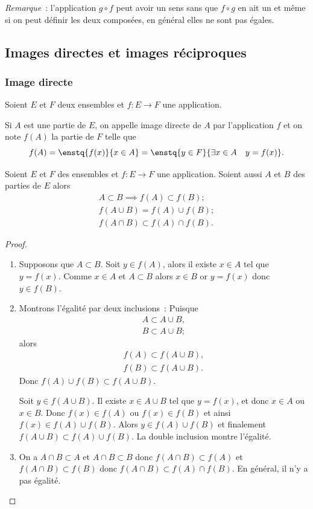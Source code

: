 \emph{Remarque}~: l'application $g \circ f$ peut avoir un sens sans que $f \circ g$ en ait un et même si on peut définir les deux composées, en général elles ne sont pas égales.
%
\subsection{Images directes et images réciproques}
\label{chap3-subsec:imagesdirecteetrec}
\subsubsection{Image directe}
\label{chap3-subsec:imagedirecte}
Soient $E$ et $F$ deux ensembles et $f: E \longrightarrow F$ une application.
\begin{defdef}
  Si $A$ est une partie de $E$, on appelle image directe de $A$ par l'application $f$ et on note $f(A)$ la partie de $F$ telle que
  \begin{equation}
    f(A)=\enstq{f(x)}{x \in A}=\enstq{y \in F}{\exists x \in A \quad y=f(x)}.
  \end{equation}
\end{defdef}
%
\begin{prop}
  Soient $E$ et $F$ des ensembles et $f:E \longrightarrow F$ une application. Soient aussi $A$ et $B$ des parties de $E$ alors
  \begin{gather}
    A \subset B \implies f(A) \subset f(B); \\
    f(A \cup B)=f(A) \cup f(B); \\
    f(A \cap B) \subset f(A) \cap f(B).
  \end{gather}
\end{prop}
\begin{proof}
  \begin{enumerate}
  \item Supposons que $A \subset B$. Soit $y \in f(A)$, alors il existe $x \in A$ tel que $y=f(x)$. Comme $x \in A$ et $A \subset B$ alors $x \in B$ or $y=f(x)$ donc $y \in f(B)$.
  \item Montrons l'égalité par deux inclusions~: Puisque
      \begin{gather}
        A \subset A \cup B, \\
        B \subset A \cup B;
      \end{gather}
      alors
      \begin{gather}
        f(A) \subset f(A \cup B), \\
        f(B) \subset f(A \cup B).
      \end{gather}
      Donc $f(A) \cup f(B) \subset f(A \cup B)$.
      
      Soit $y \in f(A \cup B)$. Il existe $x \in A \cup B$ tel que $y=f(x)$, et donc $x \in A$ ou $x \in B$. Donc $f(x) \in f(A)$ ou $f(x) \in f(B)$ et ainsi $f(x) \in f(A) \cup  f(B)$. Alors $y \in f(A) \cup f(B)$ et finalement $f(A \cup B) \subset f(A) \cup f(B)$. La double inclusion montre l'égalité.
  \item On a $A \cap B \subset A$ et $A \cap B \subset B$ donc $f(A \cap B) \subset f(A)$ et $f(A \cap B) \subset f(B)$ donc $f(A \cap B) \subset f(A) \cap f(B)$. En général, il n'y a pas égalité.
  \end{enumerate}
\end{proof}
